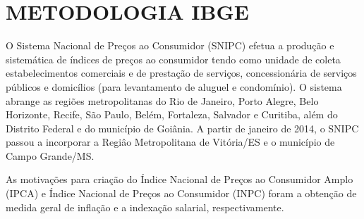 \documentclass[twoside,a4paper,11pt]{report}
\begin{document}





\appendix

\chapter{METODOLOGIA IBGE}\label{ap1}

O Sistema Nacional de Preços ao Consumidor (SNIPC) efetua a produção e sistemática de índices de preços ao consumidor tendo como unidade de coleta estabelecimentos comerciais e de prestação de serviços, concessionária de serviços públicos e domicílios (para levantamento de aluguel e condomínio). O sistema abrange as regiões metropolitanas do Rio de Janeiro, Porto Alegre, Belo Horizonte, Recife, São Paulo, Belém, Fortaleza, Salvador e Curitiba, além do Distrito Federal e do município de Goiânia. A partir de janeiro de 2014, o SNIPC passou a incorporar a Regiâo Metropolitana de Vitória/ES e o município de Campo Grande/MS. 

As motivações para criação do Índice Nacional de Preços ao Consumidor Amplo (IPCA) e Índice Nacional de Preços ao Consumidor (INPC) foram a obtenção de medida geral de inflação e a indexação salarial, respectivamente.
\end{document}
